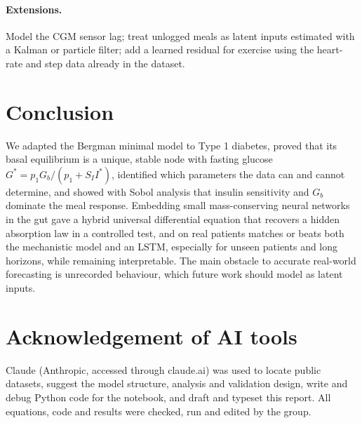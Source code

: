 \documentclass[11pt,a4paper]{article}
\begin{document}
\paragraph{Extensions.} Model the CGM sensor lag; treat unlogged meals as latent inputs estimated with a Kalman or particle filter; add a learned residual for exercise using the heart-rate and step data already in the dataset.

\section{Conclusion}
We adapted the Bergman minimal model to Type 1 diabetes, proved that its basal equilibrium is a unique, stable node with fasting glucose $G^*=p_1G_b/(p_1+S_II^*)$, identified which parameters the data can and cannot determine, and showed with Sobol analysis that insulin sensitivity and $G_b$ dominate the meal response. Embedding small mass-conserving neural networks in the gut gave a hybrid universal differential equation that recovers a hidden absorption law in a controlled test, and on real patients matches or beats both the mechanistic model and an LSTM, especially for unseen patients and long horizons, while remaining interpretable. The main obstacle to accurate real-world forecasting is unrecorded behaviour, which future work should model as latent inputs.

\section*{Acknowledgement of AI tools}
Claude (Anthropic, accessed through claude.ai) was used to locate public datasets, suggest the model structure, analysis and validation design, write and debug Python code for the notebook, and draft and typeset this report. All equations, code and results were checked, run and edited by the group.
\end{document}
